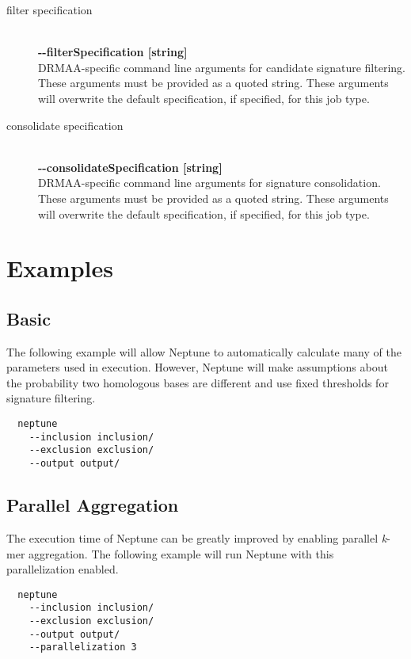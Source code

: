 \documentclass[a4paper,10pt]{article}
\begin{document}
\begin{description}
  \item[filter specification] \hfill \\
  \textbf{-{}-filterSpecification [string]} \hfill \\
  DRMAA-specific command line arguments for candidate signature filtering. These arguments must be provided as a quoted string. These arguments will overwrite the default specification, if specified, for this job type.
  
  \item[consolidate specification] \hfill \\
  \textbf{-{}-consolidateSpecification [string]} \hfill \\
  DRMAA-specific command line arguments for signature consolidation. These arguments must be provided as a quoted string. These arguments will overwrite the default specification, if specified, for this job type.
  
\end{description}

\newpage
\section{Examples}

\subsection{Basic}

The following example will allow Neptune to automatically calculate many of the parameters used in execution. However, Neptune will make assumptions about the probability two homologous bases are different and use fixed thresholds for signature filtering.

\begin{verbatim}
  neptune
    --inclusion inclusion/
    --exclusion exclusion/
    --output output/ 
\end{verbatim}

\subsection{Parallel Aggregation}

The execution time of Neptune can be greatly improved by enabling parallel \textit{k}-mer aggregation. The following example will run Neptune with this parallelization enabled.

\begin{verbatim}
  neptune
    --inclusion inclusion/
    --exclusion exclusion/
    --output output/
    --parallelization 3
\end{verbatim}
\end{document}
